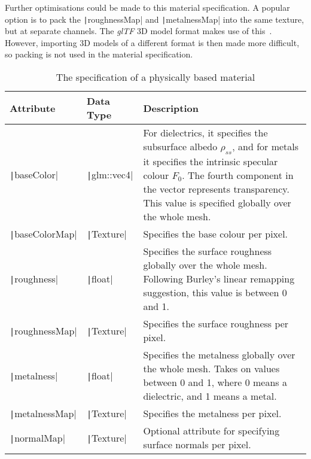 Further optimisations could be made to this material specification. A popular option is to pack the \texttt|roughnessMap| and \texttt|metalnessMap| into the same texture, but at separate channels. The \textit{glTF} 3D model format makes use of this~\cite{glTFTexture}. However, importing 3D models of a different format is then made more difficult, so packing is not used in the material specification.

\begin{table}
	\noindent\begin{tabular}{|m{7em}|m{5em}|m{29em}|}
		\hline
		\textbf{Attribute} & \textbf{Data Type} & \textbf{Description} \\
		\hline\hline
		\texttt|baseColor| & \texttt|glm::vec4| & For dielectrics, it specifies the subsurface albedo \begin{math}\rho_{ss}\end{math}, and for metals it specifies the intrinsic specular colour \begin{math}F_0\end{math}. The fourth component in the vector represents transparency. This value is specified globally over the whole mesh. \\
		\hline
		\texttt|baseColorMap| & \texttt|Texture| & Specifies the base colour per pixel. \\
		\hline
		\texttt|roughness| & \texttt|float| & Specifies the surface roughness globally over the whole mesh. Following Burley's linear remapping suggestion, this value is between 0 and 1. \\
		\hline
		\texttt|roughnessMap| & \texttt|Texture| & Specifies the surface roughness per pixel. \\
		\hline
		\texttt|metalness| & \texttt|float| & Specifies the metalness globally over the whole mesh. Takes on values between 0 and 1, where 0 means a dielectric, and 1 means a metal. \\
		\hline
		\texttt|metalnessMap| & \texttt|Texture| & Specifies the metalness per pixel. \\
		\hline
		\texttt|normalMap| & \texttt|Texture| & Optional attribute for specifying surface normals per pixel. \\
		\hline
	\end{tabular}
	\caption{The specification of a physically based material}
	\label{tb:PBRMaterial}
\end{table}

